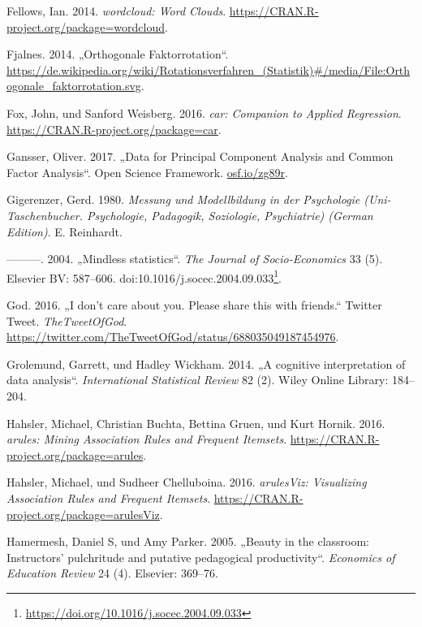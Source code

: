\documentclass[12pt,ngerman,]{book}
\let\rmarkdownfootnote\footnote%
\def\footnote{\protect\rmarkdownfootnote}
\renewcommand{\href}[2]{#2\footnote{\url{#1}}}
\begin{document}
\hypertarget{ref-R-wordcloud}{}
Fellows, Ian. 2014. \emph{wordcloud: Word Clouds}.
\url{https://CRAN.R-project.org/package=wordcloud}.

\hypertarget{ref-fjalnes_orthogonale_2014}{}
Fjalnes. 2014. „Orthogonale Faktorrotation``.
\url{https://de.wikipedia.org/wiki/Rotationsverfahren_(Statistik)\#/media/File:Orthogonale_faktorrotation.svg}.

\hypertarget{ref-R-car}{}
Fox, John, und Sanford Weisberg. 2016. \emph{car: Companion to Applied
Regression}. \url{https://CRAN.R-project.org/package=car}.

\hypertarget{ref-Gansser_2017}{}
Gansser, Oliver. 2017. „Data for Principal Component Analysis and Common
Factor Analysis``. Open Science Framework. \url{osf.io/zg89r}.

\hypertarget{ref-gigerenzer1980}{}
Gigerenzer, Gerd. 1980. \emph{Messung und Modellbildung in der
Psychologie (Uni-Taschenbucher. Psychologie, Padagogik, Soziologie,
Psychiatrie) (German Edition)}. E. Reinhardt.

\hypertarget{ref-Gigerenzer2004}{}
---------. 2004. „Mindless statistics``. \emph{The Journal of
Socio-Economics} 33 (5). Elsevier BV: 587--606.
doi:\href{https://doi.org/10.1016/j.socec.2004.09.033}{10.1016/j.socec.2004.09.033}.

\hypertarget{ref-god_i_2016}{}
God. 2016. „I don't care about you. Please share this with friends.``
Twitter Tweet. \emph{TheTweetOfGod}.
\url{https://twitter.com/TheTweetOfGod/status/688035049187454976}.

\hypertarget{ref-grolemund2014cognitive}{}
Grolemund, Garrett, und Hadley Wickham. 2014. „A cognitive
interpretation of data analysis``. \emph{International Statistical
Review} 82 (2). Wiley Online Library: 184--204.

\hypertarget{ref-R-arules}{}
Hahsler, Michael, Christian Buchta, Bettina Gruen, und Kurt Hornik.
2016. \emph{arules: Mining Association Rules and Frequent Itemsets}.
\url{https://CRAN.R-project.org/package=arules}.

\hypertarget{ref-R-arulesViz}{}
Hahsler, Michael, und Sudheer Chelluboina. 2016. \emph{arulesViz:
Visualizing Association Rules and Frequent Itemsets}.
\url{https://CRAN.R-project.org/package=arulesViz}.

\hypertarget{ref-hamermesh2005beauty}{}
Hamermesh, Daniel S, und Amy Parker. 2005. „Beauty in the classroom:
Instructors' pulchritude and putative pedagogical productivity``.
\emph{Economics of Education Review} 24 (4). Elsevier: 369--76.
\end{document}
